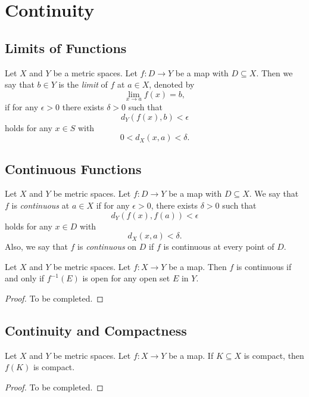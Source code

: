 \chapter{Continuity}
\section{Limits of Functions}
\begin{definition}
  Let $X$ and $Y$ be a metric spaces.
  Let $f: D \to Y$ be a map with $D \subseteq X$.
  Then we say that $b \in Y$ is the \emph{limit} of $f$ at $a \in X$, denoted
  by
  \begin{equation*}
    \lim_{x \to a} f(x) = b,
  \end{equation*}
  if for any $\epsilon > 0$ there exists $\delta > 0$ such that
  \begin{equation*}
    d_Y(f(x), b) < \epsilon
  \end{equation*}
  holds for any $x \in S$ with
  \begin{equation*}
    0 < d_X(x, a) < \delta.
  \end{equation*}
\end{definition}

\section{Continuous Functions}
\begin{definition}
  Let $X$ and $Y$ be metric spaces.
  Let $f: D \to Y$ be a map with $D \subseteq X$.
  We say that $f$ is \emph{continuous} at $a \in X$ if for any $\epsilon > 0$,
  there exists $\delta > 0$ such that
  \begin{equation*}
    d_Y(f(x), f(a)) < \epsilon
  \end{equation*}
  holds for any $x \in D$ with
  \begin{equation*}
    d_X(x, a) < \delta.
  \end{equation*}
  Also, we say that $f$ is \emph{continuous} on $D$ if $f$ is continuous at
  every point of $D$.
\end{definition}

\begin{theorem}
  Let $X$ and $Y$ be metric spaces.
  Let $f: X \to Y$ be a map.
  Then $f$ is continuous if and only if $f^{-1}(E)$ is open for any open set
  $E$ in $Y$.
\end{theorem}
\begin{proof}
  To be completed.
\end{proof}

\section{Continuity and Compactness}
\begin{theorem}
  Let $X$ and $Y$ be metric spaces.
  Let $f: X \to Y$ be a map.
  If $K \subseteq X$ is compact, then $f(K)$ is compact.
\end{theorem}
\begin{proof}
  To be completed.
\end{proof}